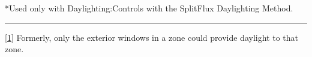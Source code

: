 *Used only with Daylighting:Controls with the SplitFlux Daylighting Method.

\begin{center}\rule{0.5\linewidth}{\linethickness}\end{center}

\protect\hyperlink{ux5fftnref1}{{[}1{]}} Formerly, only the exterior windows in a zone could provide daylight to that zone.
